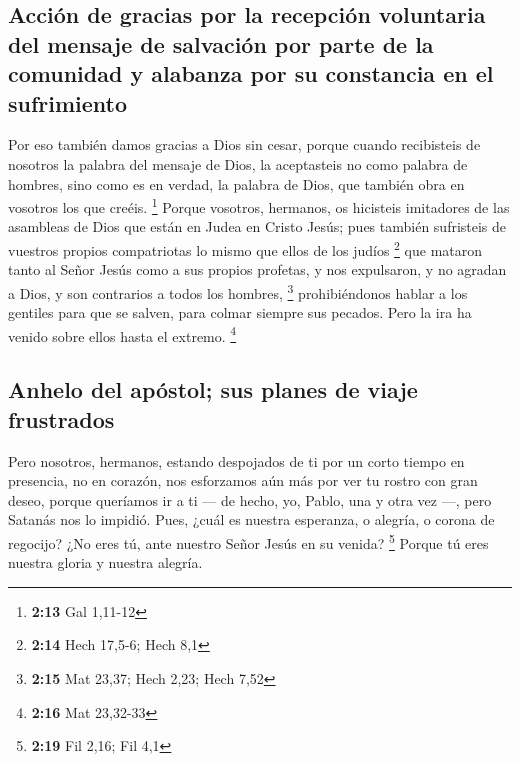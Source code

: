 \begin{paracol}{2}
{\subsection{Acción de gracias por la recepción voluntaria del mensaje de
salvación por parte de la comunidad y alabanza por su constancia en el
sufrimiento}\label{acciuxf3n-de-gracias-por-la-recepciuxf3n-voluntaria-del-mensaje-de-salvaciuxf3n-por-parte-de-la-comunidad-y-alabanza-por-su-constancia-en-el-sufrimiento}}

 Por eso también damos gracias a Dios sin cesar, porque
cuando recibisteis de nosotros la palabra del mensaje de Dios, la
aceptasteis no como palabra de hombres, sino como es en verdad, la
palabra de Dios, que también obra en vosotros los que creéis.
\footnote{\textbf{2:13} Gal 1,11-12}  Porque vosotros,
hermanos, os hicisteis imitadores de las asambleas de Dios que están en
Judea en Cristo Jesús; pues también sufristeis de vuestros propios
compatriotas lo mismo que ellos de los judíos \footnote{\textbf{2:14}
  Hech 17,5-6; Hech 8,1}  que mataron tanto al Señor
Jesús como a sus propios profetas, y nos expulsaron, y no agradan a
Dios, y son contrarios a todos los hombres, \footnote{\textbf{2:15} Mat
  23,37; Hech 2,23; Hech 7,52}  prohibiéndonos hablar a
los gentiles para que se salven, para colmar siempre sus pecados. Pero
la ira ha venido sobre ellos hasta el extremo. \footnote{\textbf{2:16}
  Mat 23,32-33}

\hypertarget{anhelo-del-apuxf3stol-sus-planes-de-viaje-frustrados}{%
\subsection{Anhelo del apóstol; sus planes de viaje
frustrados}\label{anhelo-del-apuxf3stol-sus-planes-de-viaje-frustrados}}

 Pero nosotros, hermanos, estando despojados de ti por un
corto tiempo en presencia, no en corazón, nos esforzamos aún más por ver
tu rostro con gran deseo,  porque queríamos ir a ti ---
de hecho, yo, Pablo, una y otra vez ---, pero Satanás nos lo impidió.
 Pues, ¿cuál es nuestra esperanza, o alegría, o corona de
regocijo? ¿No eres tú, ante nuestro Señor Jesús en su venida?
\footnote{\textbf{2:19} Fil 2,16; Fil 4,1}  Porque tú
eres nuestra gloria y nuestra alegría.

\switchcolumn
\begin{otherlanguage}{english}


\end{otherlanguage}
\end{paracol}
